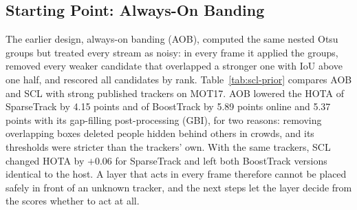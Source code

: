 \subsection{Starting Point: Always-On Banding}\label{sec:scl-prior}
The earlier design, always-on banding (AOB), computed the same nested Otsu groups but treated every stream as noisy: in every frame it applied the groups, removed every weaker candidate that overlapped a stronger one with IoU above one half, and rescored all candidates by rank. Table~\ref{tab:scl-prior} compares AOB and SCL with strong published trackers on MOT17. AOB lowered the HOTA of SparseTrack by 4.15 points and of BoostTrack by 5.89 points online and 5.37 points with its gap-filling post-processing (GBI), for two reasons: removing overlapping boxes deleted people hidden behind others in crowds, and its thresholds were stricter than the trackers' own. With the same trackers, SCL changed HOTA by $+0.06$ for SparseTrack and left both BoostTrack versions identical to the host. A layer that acts in every frame therefore cannot be placed safely in front of an unknown tracker, and the next steps let the layer decide from the scores whether to act at all.

